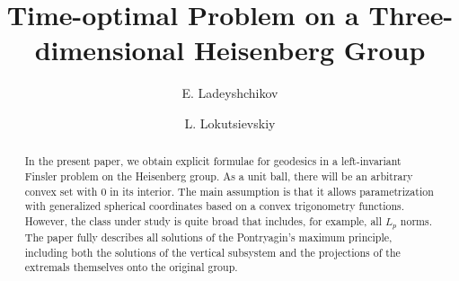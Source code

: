 \begin{englishtitle} %
\title{Time-optimal Problem on a Three-dimensional Heisenberg Group}
\author{E. Ladeyshchikov
  \and
  L. Lokutsievskiy
}

\maketitle

\begin{abstract}
In the present paper, we obtain explicit formulae for geodesics in a left-invariant Finsler problem on the Heisenberg group. As a unit ball, there will be an arbitrary convex set with 0 in its interior. The main assumption is that it allows parametrization with generalized spherical coordinates based on a convex trigonometry functions. However, the class under study is quite broad that includes, for example, all \(L_p\) norms. The paper fully describes all solutions of the Pontryagin's maximum principle, including both the solutions of the vertical subsystem and the projections of the extremals themselves onto the original group.
\end{abstract}
\end{englishtitle}

\iffalse


%
%

